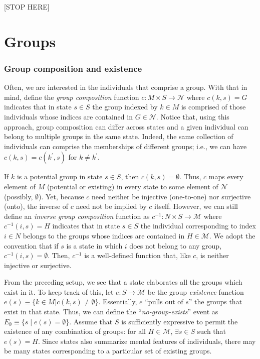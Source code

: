 \documentclass[
11pt,
titlepage,
reqno,
]{article}%
\theoremstyle{definition}
\begin{document}
	
	[STOP HERE]
	
	
	
	\section{Groups}  

	 
	
	\subsubsection{Group composition and existence}
	Often, we are interested in the individuals that comprise a group. With that in mind, define the \textit{group composition} function $c:M\times S \rightarrow \mathcal{N}$ where $c(k,s)=G$ indicates that in state $s\in S$ the group indexed by $k\in M$ is comprised of those individuals whose indices are contained in $G\in\mathcal{N}$. Notice that, using this approach, group composition can differ across states and  a given individual can belong to multiple groups in the same state. Indeed, the same collection of individuals can comprise the memberships of different  groups; i.e., we can have $c(k,s)=c(k^\prime,s)$ for $k\ne k^\prime$.
	
	If $k$ is a potential group in state $s\in S$, then $c(k,s)=\emptyset$. Thus, $c$ maps every element of $M$ (potential or existing) in every state to some element of $\mathcal{N}$ (possibly, $\emptyset$). Yet, because $c$ need neither be injective (one-to-one) nor surjective (onto), the inverse of $c$ need not be implied by $c$ itself. However, we can still define an \textit{inverse group composition} function as $c^{-1}:N\times S \rightarrow \mathcal{M}$ where $c^{-1}(i,s)=H$ indicates that in state $s\in S$ the individual corresponding to index $i\in N$ belongs to the groups whose indices are contained in $H\in\mathcal{M}$. We adopt the convention that if $s$ is a state in which $i$ does not belong to any group, $c^{-1}(i,s)=\emptyset$. Then, $c^{-1}$ is a well-defined function that, like $c$, is neither injective or surjective.
	
	From the preceding setup, we see that a state elaborates all the groups which exist in it. To keep track of this, let $e:S \rightarrow \mathcal{M}$ be the group \textit{existence} function  $e(s)\equiv\{k\in M|c(k,s)\ne \emptyset\}$.  Essentially, $e$  ``pulls out of $s$'' the groups that exist in that state.   Thus, we can define the ``\textit{no-group-exists}'' event as   $E_\emptyset\equiv\{s\mid e(s)=\emptyset\}$. Assume that $S$ is sufficiently expressive to permit the existence of any combination of groups: for all $H\in\mathcal{M}$, $\exists s\in S$ such that $e(s)=H$. Since states also summarize mental features of individuals, there may be many states corresponding to a particular set of existing groups. %
	
\end{document}

